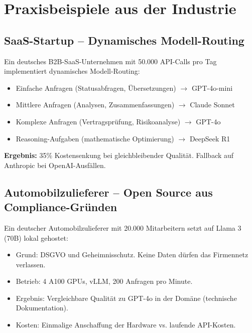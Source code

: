 \section{Praxisbeispiele aus der Industrie}

\subsection{SaaS-Startup -- Dynamisches Modell-Routing}

Ein deutsches B2B-SaaS-Unternehmen mit 50.000 API-Calls pro Tag implementiert dynamisches Modell-Routing:

\begin{itemize}[leftmargin=*]
    \item Einfache Anfragen (Statusabfragen, Übersetzungen) $\rightarrow$ GPT-4o-mini
    \item Mittlere Anfragen (Analysen, Zusammenfassungen) $\rightarrow$ Claude Sonnet
    \item Komplexe Anfragen (Vertragsprüfung, Risikoanalyse) $\rightarrow$ GPT-4o
    \item Reasoning-Aufgaben (mathematische Optimierung) $\rightarrow$ DeepSeek R1
\end{itemize}

\textbf{Ergebnis:} 35\% Kostensenkung bei gleichbleibender Qualität. Fallback auf Anthropic bei OpenAI-Ausfällen.

\subsection{Automobilzulieferer -- Open Source aus Compliance-Gründen}

Ein deutscher Automobilzulieferer mit 20.000 Mitarbeitern setzt auf Llama 3 (70B) lokal gehostet:

\begin{itemize}[leftmargin=*]
    \item Grund: DSGVO und Geheimnisschutz. Keine Daten dürfen das Firmennetz verlassen.
    \item Betrieb: 4 A100 GPUs, vLLM, 200 Anfragen pro Minute.
    \item Ergebnis: Vergleichbare Qualität zu GPT-4o in der Domäne (technische Dokumentation).
    \item Kosten: Einmalige Anschaffung der Hardware vs. laufende API-Kosten.
\end{itemize}

